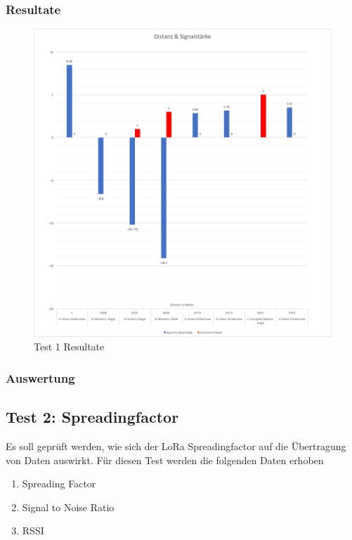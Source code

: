 \documentclass[11pt,english,german]{report}
\theoremstyle{definition}
\begin{document}
\subsubsection{Resultate}
\begin{figure}[H]
	\centering
	\includegraphics[width=\textwidth]{img/testing/testing3_lostpackets.png}
	\caption[Test 1 Resultate]
	{Test 1 Resultate}
\end{figure}
\subsubsection{Auswertung}

\newpage
\subsection{Test 2: Spreadingfactor}
Es soll geprüft werden, wie sich der LoRa Spreadingfactor auf die Übertragung von Daten auswirkt.
Für diesen Test werden die folgenden Daten erhoben
\begin{enumerate}
	\item Spreading Factor
	\item Signal to Noise Ratio
	\item RSSI
\end{enumerate}
\end{document}
